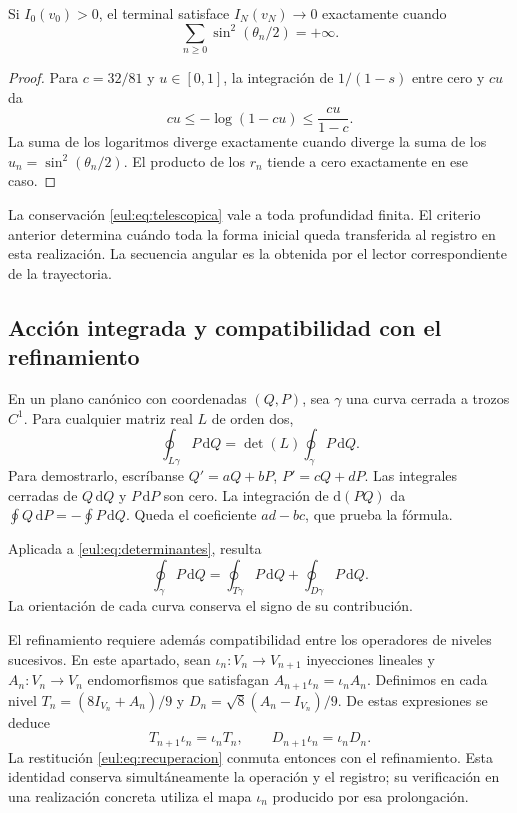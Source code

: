 \begin{proposicion}
Si \(I_0(v_0)>0\), el terminal satisface \(I_N(v_N)\to0\) exactamente
cuando
\[
 \sum_{n\ge0}\sin^2(\theta_n/2)=+\infty.
\]
\end{proposicion}
\begin{proof}
Para \(c=32/81\) y \(u\in[0,1]\), la integración de
\(1/(1-s)\) entre cero y \(cu\) da
\[
 cu\le-\log(1-cu)\le\frac{cu}{1-c}.
\]
La suma de los logaritmos diverge exactamente cuando diverge la suma
de los \(u_n=\sin^2(\theta_n/2)\). El producto de los \(r_n\)
tiende a cero exactamente en ese caso.
\end{proof}

La conservación \eqref{eul:eq:telescopica} vale a toda profundidad
finita. El criterio anterior determina cuándo toda la forma inicial
queda transferida al registro en esta realización. La secuencia angular
es la obtenida por el lector correspondiente de la trayectoria.

\subsection{Acción integrada y compatibilidad con el refinamiento}
\label{eul:accion-refinamiento}

En un plano canónico con coordenadas \((Q,P)\), sea \(\gamma\) una curva
cerrada a trozos \(C^1\). Para cualquier matriz real \(L\) de orden dos,
\begin{equation}
 \oint_{L\gamma}P\,\mathrm dQ
 =\det(L)\oint_\gamma P\,\mathrm dQ.
\label{eul:eq:accion-determinante}
\end{equation}
Para demostrarlo, escríbanse \(Q'=aQ+bP\), \(P'=cQ+dP\).
Las integrales cerradas de \(Q\,\mathrm dQ\) y \(P\,\mathrm dP\)
son cero. La integración de \(\mathrm d(PQ)\) da
\(\oint Q\,\mathrm dP=-\oint P\,\mathrm dQ\). Queda el coeficiente
\(ad-bc\), que prueba la fórmula.

Aplicada a \eqref{eul:eq:determinantes}, resulta
\[
 \oint_\gamma P\,\mathrm dQ
 =\oint_{T\gamma}P\,\mathrm dQ
  +\oint_{D\gamma}P\,\mathrm dQ.
\]
La orientación de cada curva conserva el signo de su contribución.

El refinamiento requiere además compatibilidad entre los operadores
de niveles sucesivos. En este apartado, sean
\(\iota_n:V_n\to V_{n+1}\) inyecciones lineales y
\(A_n:V_n\to V_n\) endomorfismos que satisfagan
\(A_{n+1}\iota_n=\iota_nA_n\). Definimos en cada nivel
\(T_n=(8I_{V_n}+A_n)/9\) y
\(D_n=\sqrt8(A_n-I_{V_n})/9\). De estas expresiones se deduce
\[
 T_{n+1}\iota_n=\iota_nT_n,
 \qquad D_{n+1}\iota_n=\iota_nD_n.
\]
La restitución \eqref{eul:eq:recuperacion} conmuta entonces con el
refinamiento. Esta identidad conserva simultáneamente la operación
y el registro; su verificación en una realización concreta utiliza
el mapa \(\iota_n\) producido por esa prolongación.

